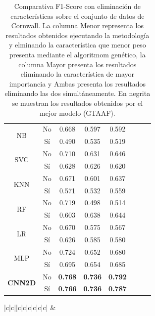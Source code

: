 \documentclass{uathesis-es}
\begin{document}
{\begin{table}[H]
\begin{center}
\begin{tabular}{|c|c||c|c|c|c|c|c|}
        \multirow{2}{*}{NB} &
            No & 0.668 & 0.597 & 0.592\\ &
		    Sí  & 0.490 & 0.535 & 0.519 \\ \hline \hline
        \multirow{2}{*}{SVC} &
            No & 0.710 & 0.631 & 0.646\\ &
		    Sí  & 0.628 & 0.626 & 0.620 \\ \hline \hline
        \multirow{2}{*}{KNN} &
            No & 0.671 & 0.601 & 0.637\\ &
		    Sí  & 0.571 & 0.532 & 0.559 \\ \hline \hline
        \multirow{2}{*}{RF} &
            No & 0.719 & 0.498 & 0.514\\ &
		    Sí  & 0.603 & 0.638 & 0.644 \\ \hline \hline
        \multirow{2}{*}{LR} &
            No & 0.670 & 0.575 & 0.567\\ &
		    Sí  & 0.626 & 0.585 & 0.580 \\ \hline \hline
        \multirow{2}{*}{MLP} &
            No & 0.724 & 0.652 & 0.680\\ &
		    Sí  & 0.695 & 0.654 & 0.685 \\ \hline \hline
        \multirow{2}{*}{\textbf{CNN2D}} &
            No & \textbf{0.768} & \textbf{0.736} & \textbf{0.792}\\ &
		    Sí  & \textbf{0.766} & \textbf{0.736} & \textbf{0.787} \\ \hline \hline
		\end{tabular}
	\end{center}
	\caption{Comparativa F1-Score con eliminación de características sobre el conjunto de datos de Cornwall. La columna Menor representa los resultados obtenidos ejecutando la metodología y elminando la característica que menor peso presenta mediante el algoritmom genético, la columna Mayor presenta los resultados eliminando la característica de mayor importancia y Ambas presenta los resultados eliminando las dos simultáneamente. En negrita se muestran los resultados obtenidos por el mejor modelo (GTAAF).}
	\label{CornwallLoss}
\end{table}


\begin{table}[H]
	\begin{center}
		\begin{tabular}{|c|c||c|c|c|c|c|c|}
		\hline
		 &
		 \\ \hline


\end{tabular}
\end{center}
\end{table}}
\end{document}
